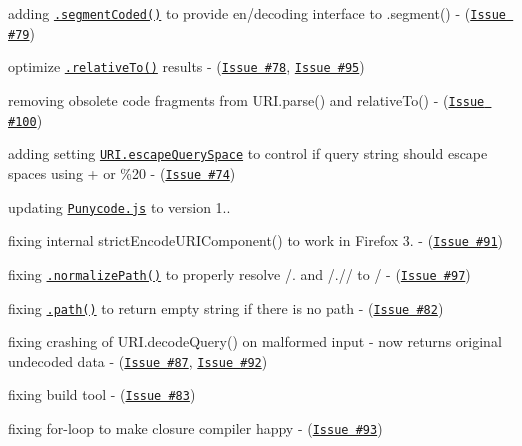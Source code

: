 \begin{DoxyItemize}
\item adding \href{http://medialize.github.io/URI.js/docs.html#accessors-segmentCoded}{\tt {\ttfamily .segment\+Coded()}} to provide en/decoding interface to {\ttfamily .segment()} -\/ (\href{https://github.com/medialize/URI.js/issues/79}{\tt Issue \#79})
\item optimize \href{http://medialize.github.io/URI.js/docs.html#relativeto}{\tt {\ttfamily .relative\+To()}} results -\/ (\href{https://github.com/medialize/URI.js/issues/78}{\tt Issue \#78}, \href{https://github.com/medialize/URI.js/issues/95}{\tt Issue \#95})
\item removing obsolete code fragments from {\ttfamily U\+R\+I.\+parse()} and {\ttfamily relative\+To()} -\/ (\href{https://github.com/medialize/URI.js/issues/100}{\tt Issue \#100})
\item adding setting \href{http://medialize.github.io/URI.js/docs.html#setting-escapeQuerySpace}{\tt {\ttfamily U\+R\+I.\+escape\+Query\+Space}} to control if query string should escape spaces using {\ttfamily +} or {\ttfamily \%20} -\/ (\href{https://github.com/medialize/URI.js/issues/74}{\tt Issue \#74})
\item updating \href{https://github.com/bestiejs/punycode.js/}{\tt Punycode.\+js} to version 1..
\item fixing internal {\ttfamily strict\+Encode\+U\+R\+I\+Component()} to work in Firefox 3. -\/ (\href{https://github.com/medialize/URI.js/issues/91}{\tt Issue \#91})
\item fixing \href{http://medialize.github.io/URI.js/docs.html#normalize-path}{\tt {\ttfamily .normalize\+Path()}} to properly resolve {\ttfamily /.} and {\ttfamily /.//} to {\ttfamily /} -\/ (\href{https://github.com/medialize/URI.js/issues/97}{\tt Issue \#97})
\item fixing \href{http://medialize.github.io/URI.js/docs.html#accessors-pathname}{\tt {\ttfamily .path()}} to return empty string if there is no path -\/ (\href{https://github.com/medialize/URI.js/issues/82}{\tt Issue \#82})
\item fixing crashing of {\ttfamily U\+R\+I.\+decode\+Query()} on malformed input -\/ now returns original undecoded data -\/ (\href{https://github.com/medialize/URI.js/issues/87}{\tt Issue \#87}, \href{https://github.com/medialize/URI.js/issues/92}{\tt Issue \#92})
\item fixing build tool -\/ (\href{https://github.com/medialize/URI.js/issues/83}{\tt Issue \#83})
\item fixing for-\/loop to make closure compiler happy -\/ (\href{https://github.com/medialize/URI.js/issues/93}{\tt Issue \#93})

\end{DoxyItemize}
